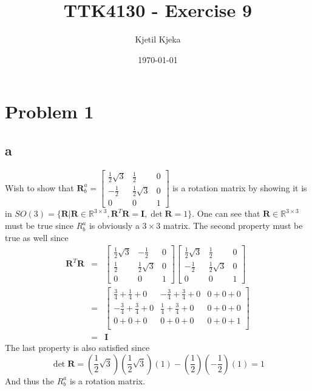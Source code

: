\documentclass[11pt]{article}
\author{Kjetil Kjeka}
\title{TTK4130 - Exercise 9}
\date{\today}
\begin{document}
\maketitle
\section*{Problem 1}
\subsection*{a}
Wish to show that $\mathbf{R}_b^a = 
\begin{bmatrix}
\frac{1}{2} \sqrt{3} & \frac{1}{2} & 0 \\
-\frac{1}{2} & \frac{1}{2} \sqrt{3} & 0 \\
0 & 0 & 1
\end{bmatrix}
$ is a rotation matrix by showing it is in $SO(3) = 
\{\mathbf{R} | \mathbf{R} \in \mathbb{R}^{3\times3}, \mathbf{R}^T \mathbf{R} = \mathbf{I}, \det{\mathbf{R}} = 1 \}$. One can see that $\mathbf{R} \in \mathbb{R}^{3\times3}$ must be true since $R_b^a$ is obviously a $3\times3$ matrix. The second property must be true as well since 
\begin{eqnarray*}
\mathbf{R}^T \mathbf{R} &=& 
\begin{bmatrix}
\frac{1}{2} \sqrt{3} & -\frac{1}{2} & 0 \\
\frac{1}{2} & \frac{1}{2} \sqrt{3} & 0 \\
0 & 0 & 1
\end{bmatrix}
\begin{bmatrix}
\frac{1}{2} \sqrt{3} & \frac{1}{2} & 0 \\
-\frac{1}{2} & \frac{1}{2} \sqrt{3} & 0 \\
0 & 0 & 1
\end{bmatrix} \\
&=& 
\begin{bmatrix}
\frac{3}{4} + \frac{1}{4} + 0 & - \frac{3}{4} + \frac{3}{4} + 0 & 0 + 0 + 0 \\
- \frac{3}{4} + \frac{3}{4} + 0 & \frac{1}{4} + \frac{3}{4} + 0 & 0 + 0 + 0 \\
0 + 0 + 0 & 0 + 0 + 0 & 0 + 0 + 1 \\
\end{bmatrix} \\
&=&
\mathbf{I}
\end{eqnarray*}
The last property is also satisfied since
\[\det{\mathbf{R}} = (\frac{1}{2} \sqrt{3})(\frac{1}{2} \sqrt{3})(1) - (\frac{1}{2})(-\frac{1}{2})(1) = 1 \]
And thus the $R_b^a$ is a rotation matrix.
\end{document}
